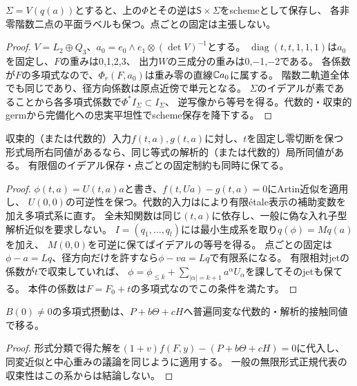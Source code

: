 \begin{proposition}[Pl\"ucker錐と平面ラベルの保存]
$\Sigma=V(q(a))$とすると、上の$\Phi$とその逆は$\mathsf S\times\Sigma$をschemeとして保存し、
各非零階数二点の平面ラベルも保つ。点ごとの固定は主張しない。
\end{proposition}
\begin{proof}
$V=L_2\oplus Q_3$、$a_0=e_0\wedge e_1\otimes(\det V)^{-1}$とする。
$\operatorname{diag}(t,t,1,1,1)$は$a_0$を固定し、$F$の重みは0,1,2,3、
出力$W$の三成分の重みは0,−1,−2である。
各係数が$F$の多項式なので、$\Phi_r(F,a_0)$は重み零の直線$\mathbb C a_0$に属する。
階数二軌道全体でも同じであり、径方向係数は原点近傍で単元となる。
$\Sigma$のイデアルが素であることから各多項式係数で$\Phi^*I_\Sigma\subset I_\Sigma$、
逆写像から等号を得る。代数的・収束的germから完備化への忠実平坦性でscheme保存を降下する。
\end{proof}
\begin{proposition}[固定パラメータでの独立なArtin論証]
収束的（または代数的）入力$f(t,a),g(t,a)$に対し、$t$を固定し零切断を保つ
形式局所右同値があるなら、同じ等式の解析的（または代数的）局所同値がある。
有限個のイデアル保存・点ごとの固定制約も同時に保てる。
\end{proposition}
\begin{proof}
$\phi(t,a)=U(t,a)a$と書き、$f(t,Ua)-g(t,a)=0$にArtin近似\cite[Theorem 1.2]{PfArtinAnalytic}を適用し、
$U(0,0)$の可逆性を保つ。代数的入力は\cite[Theorem 1.10]{PfArtinAlgebraic}により有限\'{e}tale表示の補助変数を加え多項式系に直す。
全未知関数は同じ$(t,a)$に依存し、一般に偽な入れ子型解析近似を要求しない。
$I=(q_1,\ldots,q_l)$には最小生成系を取り$q(\phi)=M q(a)$を加え、
$M(0,0)$を可逆に保てばイデアルの等号を得る。
点ごとの固定は$\phi-a=Lq$、径方向だけを許すなら$\phi-va=Lq$で有限系になる。
有限相対jetの係数が$t$で収束していれば、
$\phi=\phi_{\le k}+\sum_{|\alpha|=k+1}a^\alpha U_\alpha$を課してそのjetも保てる。
本件の係数は$F=F_0+t$の多項式なのでこの条件を満たす。
\end{proof}
\begin{corollary}[normal開層の多項式摂動の代数的実現]
$B(0)\ne0$の多項式摂動は、$P+b\Theta+cH$へ普遍同変な代数的・解析的接触同値で移る。
\end{corollary}
\begin{proof}
形式分類で得た解を$(1+v)f(F,y)-(P+b\Theta+cH)=0$に代入し、
同変近似と中心重みの議論を同じように適用する。
一般の無限形式正規代表の収束性はこの系からは結論しない。
\end{proof}
